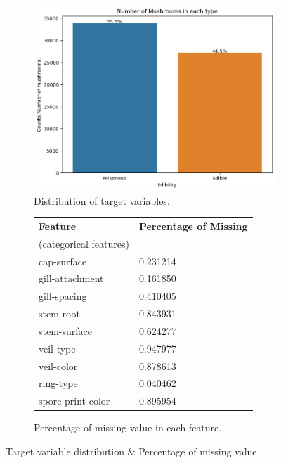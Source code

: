 \documentclass{article}
\begin{document}
\begin{figure}[ht]
  \begin{subfigure}{0.5\textwidth}
    \centering
        \centering
        \includegraphics[width=\textwidth]{eda_target.png}
        \caption{\label{fig:target variable} Distribution of target variables.}
  \end{subfigure}%
  \hfill
  \begin{subfigure}{0.48\textwidth}

    \begin{tabular}{|l|l|} \hline
        \textbf{Feature} & \textbf{Percentage of Missing} \\
        (categorical features) & \\\hline
        cap-surface & 0.231214 \\\hline
        gill-attachment & 0.161850 \\\hline
        gill-spacing & 0.410405 \\\hline
        stem-root & 0.843931 \\\hline
        stem-surface & 0.624277 \\\hline
        veil-type & 0.947977 \\\hline
        veil-color & 0.878613 \\\hline
        ring-type & 0.040462 \\\hline
        spore-print-color & 0.895954 \\ \hline
    \end{tabular}
    \caption{\label{tab:widgets} Percentage of missing value in each feature.}
  \end{subfigure}
  \caption{Target variable distribution \& Percentage of missing value}
\end{figure}
\end{document}
